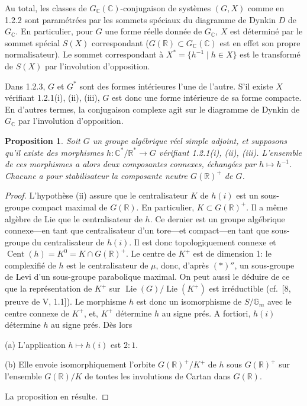 \documentclass[12pt,a4paper]{article}
\theoremstyle{plain}
\newtheorem{proposition}[theorem]{Proposition}
\theoremstyle{definition}
\theoremstyle{remark}
\DeclareMathOperator{\Lie}{Lie}
\DeclareMathOperator{\Cent}{Cent}
\newcommand{\RR}{\mathbb{R}}
\newcommand{\CC}{\mathbb{C}}
\newcommand{\Gm}{\mathbb{G}}
\begin{document}
Au total, les classes de $G_{\CC}(\CC)$-conjugaison de syst\`emes $(G,X)$ comme en 1.2.2 sont param\'etr\'ees par les sommets sp\'eciaux du diagramme de Dynkin $D$ de $G_{\CC}$. En particulier, pour $G$ une forme r\'eelle donn\'ee de $G_{\CC}$, $X$ est d\'etermin\'e par le sommet sp\'ecial $S(X)$ correspondant ($G(\RR) \subset G_{\CC}(\CC)$ est en effet son propre normalisateur). Le sommet correspondant \`a $X^* = \{h^{-1} \mid h \in X\}$ est le transform\'e de $S(X)$ par l'involution d'opposition.

Dans 1.2.3, $G$ et $G^*$ sont des formes int\'erieures l'une de l'autre. S'il existe $X$ v\'erifiant 1.2.1(i), (ii), (iii), $G$ est donc une forme int\'erieure de sa forme compacte. En d'autres termes, la conjugaison complexe agit sur le diagramme de Dynkin de $G_{\CC}$ par l'involution d'opposition.

\begin{proposition}
Soit $G$ un groupe alg\'ebrique r\'eel simple adjoint, et supposons qu'il existe des morphismes $h:\CC^*/\RR^* \to G$ v\'erifiant 1.2.1(i), (ii), (iii). L'ensemble de ces morphismes a alors deux composantes connexes, \'echang\'ees par $h \mapsto h^{-1}$. Chacune a pour stabilisateur la composante neutre $G(\RR)^+$ de $G$.
\end{proposition}

\begin{proof}
L'hypoth\`ese (ii) assure que le centralisateur $K$ de $h(i)$ est un sous-groupe compact maximal de $G(\RR)$. En particulier, $K \subset G(\RR)^+$. Il a m\^eme alg\`ebre de Lie que le centralisateur de $h$. Ce dernier est un groupe alg\'ebrique connexe---en tant que centralisateur d'un tore---et compact---en tant que sous-groupe du centralisateur de $h(i)$. Il est donc topologiquement connexe et $\Cent(h) = K^0 = K \cap G(\RR)^+$. Le centre de $K^+$ est de dimension 1: le complexifi\'e de $h$ est le centralisateur de $\mu$, donc, d'apr\`es $(*)''$, un sous-groupe de Levi d'un sous-groupe parabolique maximal. On peut aussi le d\'eduire de ce que la repr\'esentation de $K^+$ sur $\Lie(G)/\Lie(K^+)$ est irr\'eductible (cf.~[8, preuve de V, 1.1]). Le morphisme $h$ est donc un isomorphisme de $S/\Gm_m$ avec le centre connexe de $K^+$, et, $K^+$ d\'etermine $h$ au signe pr\'es. A fortiori, $h(i)$ d\'etermine $h$ au signe pr\'es. D\`es lors

(a) L'application $h \mapsto h(i)$ est $2:1$.

(b) Elle envoie isomorphiquement l'orbite $G(\RR)^+/K^+$ de $h$ sous $G(\RR)^+$ sur l'ensemble $G(\RR)/K$ de toutes les involutions de Cartan dans $G(\RR)$.

La proposition en r\'esulte.
\end{proof}
\end{document}
